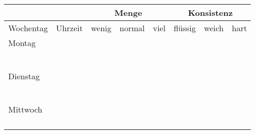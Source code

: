 \documentclass[a4paper]{article}
\begin{document}
\pagestyle{empty}

\begin{tabular}{lc||c|c|c||c|c|c}
  \toprule
  \multicolumn{2}{c}{} & \multicolumn{3}{c}{Menge} & \multicolumn{3}{c}{Konsistenz} \\
  \midrule
  Wochentag  & Uhrzeit & wenig & normal & viel     & flüssig & weich & hart \\
  \midrule
  Montag     &         &       &        &          &         &       &      \\
             &         &       &        &          &         &       &      \\
             &         &       &        &          &         &       &      \\
             &         &       &        &          &         &       &      \\
             &         &       &        &          &         &       &      \\
             &         &       &        &          &         &       &      \\
             &         &       &        &          &         &       &      \\
  \midrule
  Dienstag   &         &       &        &          &         &       &      \\
             &         &       &        &          &         &       &      \\
             &         &       &        &          &         &       &      \\
             &         &       &        &          &         &       &      \\
             &         &       &        &          &         &       &      \\
             &         &       &        &          &         &       &      \\
             &         &       &        &          &         &       &      \\
  \midrule
  Mittwoch   &         &       &        &          &         &       &      \\
             &         &       &        &          &         &       &      \\
             &         &       &        &          &         &       &      \\
             &         &       &        &          &         &       &      \\
             &         &       &        &          &         &       &      \\

\end{tabular}
\end{document}
